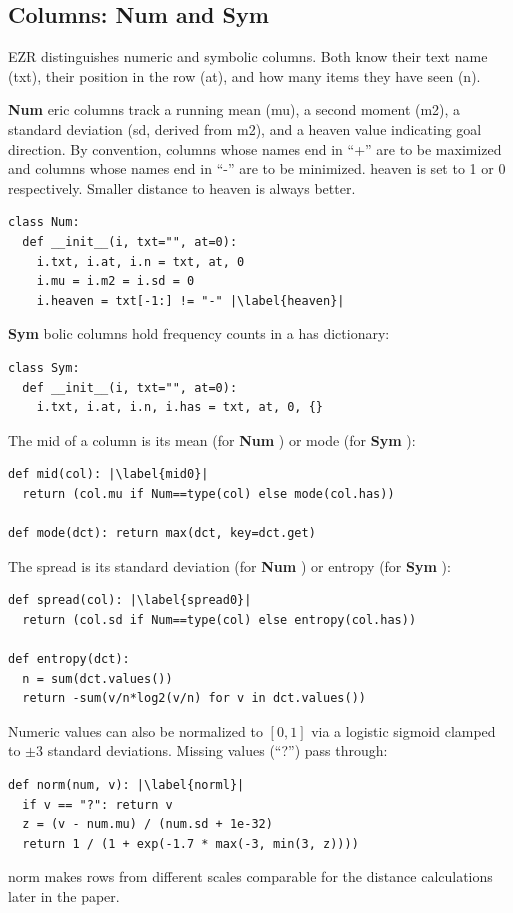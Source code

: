 \documentclass[AMA,STIX2COL]{WileyNJDv5}
\newcommand{\IT}{{\sffamily EZR}}
\newcommand{\cls}[1]{%
  \setlength{\fboxsep}{1.5pt}%
  \colorbox{clsbg}{\sffamily\bfseries{#1}}%
}
\begin{document}
{\subsection{Columns: \cls{Num} and \cls{Sym}}

\IT{} distinguishes numeric and symbolic columns. Both know
their text name (\textsf{txt}), their position in the row
(\textsf{at}), and how many items they have seen (\textsf{n}).

\cls{Num}eric columns track a running mean (\textsf{mu}), a
second moment (\textsf{m2}), a standard deviation (\textsf{sd},
derived from \textsf{m2}), and a \textsf{heaven} value
indicating goal direction. By convention, columns whose names
end in ``+'' are to be maximized and columns whose names end in
``-'' are to be minimized. \textsf{heaven} is set to 1 or 0
respectively. Smaller distance to \textsf{heaven} is always
better.
\begin{verbatim}
class Num:
  def __init__(i, txt="", at=0):
    i.txt, i.at, i.n = txt, at, 0
    i.mu = i.m2 = i.sd = 0
    i.heaven = txt[-1:] != "-" |\label{heaven}|
\end{verbatim}
\cls{Sym}bolic columns hold frequency counts in a \textsf{has}
dictionary:
\begin{verbatim}
class Sym:
  def __init__(i, txt="", at=0):
    i.txt, i.at, i.n, i.has = txt, at, 0, {}
\end{verbatim}
The \textsf{mid} of a column is its mean (for \cls{Num}) or
mode (for \cls{Sym}):
\begin{verbatim}
def mid(col): |\label{mid0}|
  return (col.mu if Num==type(col) else mode(col.has))

def mode(dct): return max(dct, key=dct.get)
\end{verbatim}
The \textsf{spread} is its standard deviation (for \cls{Num})
or entropy (for \cls{Sym}):
\begin{verbatim}
def spread(col): |\label{spread0}|
  return (col.sd if Num==type(col) else entropy(col.has))

def entropy(dct):
  n = sum(dct.values())
  return -sum(v/n*log2(v/n) for v in dct.values())
\end{verbatim}
Numeric values can also be normalized to $[0,1]$ via a logistic
sigmoid clamped to $\pm3$ standard deviations. Missing values
(``?'') pass through:
\begin{verbatim}
def norm(num, v): |\label{norml}|
  if v == "?": return v
  z = (v - num.mu) / (num.sd + 1e-32)
  return 1 / (1 + exp(-1.7 * max(-3, min(3, z))))
\end{verbatim}
\textsf{norm} makes rows from different scales comparable for
the distance calculations later in the paper.

}
\end{document}
